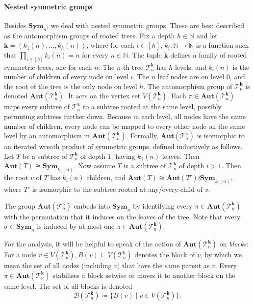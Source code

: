 \documentclass[11pt]{article}
\newcommand{\Aut}{\mathbf{Aut}}
\newcommand{\Sym}{\mathbf{Sym}}
\newcommand{\bbN}{\mathbb{N}}
\newcommand{\Bb}{{\mathcal B}}
\newcommand{\Tt}{{\mathcal T}}
\theoremstyle{definition}
\theoremstyle{plain}
\theoremstyle{remark}
\theoremstyle{remark}
\begin{document}
\paragraph*{Nested symmetric groups}
Besides $\Sym_n$, we deal with nested symmetric groups. These are best described as the automorphism groups of rooted trees. 
Fix a depth $h \in \bbN$ and let $\boldsymbol{k} = (k_1(n), \dots, k_h(n))$, where for each $i \in [h]$, $k_i \colon \bbN \to \bbN$ is a function such that $\prod_{i \in [h]} k_i(n) = n$ for every $n \in \bbN$. The tuple $\boldsymbol{k}$ defines a family of rooted symmetric trees, one for each $n$: The $n$-th tree $\Tt_n^{\boldsymbol{k}}$ has $h$ levels, and $k_i(n)$ is the number of children of every node on level $i$. 
The $n$ leaf nodes are on level $0$, and the root of the tree is the only node on level $h$. The automorphism group of $\Tt_n^{\boldsymbol{k}}$ is denoted $\Aut(\Tt_n^{\boldsymbol{k}})$. It acts on the vertex set $V(\Tt_n^{\boldsymbol{k}})$. Each $\pi \in \Aut(\Tt_n^{\boldsymbol{k}})$ maps every subtree of $\Tt_n^{\boldsymbol{k}}$ to a subtree rooted at the same level, possibly permuting subtrees further down. Because in each level, all nodes have the same number of children, every node can be mapped to every other node on the same level by an automorphism in $\Aut(\Tt_n^{\boldsymbol{k}})$.
Formally, $\Aut(\Tt_n^{\boldsymbol{k}})$ is isomorphic to an iterated wreath product of symmetric groups, defined inductively as follows.
Let $T$ be a subtree of $\Tt_n^{\boldsymbol{k}}$ of depth $1$, having $k_1(n)$ leaves. Then $\Aut(T) \cong \Sym_{k_1(n)}$. Now assume $T$ is a subtree of $\Tt_n^{\boldsymbol{k}}$ of depth $i > 1$. Then the root $v$ of $T$ has $k_i(n)$ children, and $\Aut(T) \cong \Aut(T') \wr \Sym_{k_i(n)}$, where $T'$ is isomorphic to the subtree rooted at any/every child of $v$. 


The group $\Aut(\Tt_n^{\boldsymbol{k}})$ embeds into $\Sym_n$ by identifying every $\pi \in \Aut(\Tt_n^{\boldsymbol{k}})$ with the permutation that it induces on the leaves of the tree. Note that every $\sigma \in \Sym_n$ is induced by at most one $\pi \in \Aut(\Tt_n^{\boldsymbol{k}})$. 

For the analysis, it will be helpful to speak of the action of $\Aut(\Tt_n^{\boldsymbol{k}})$ on \emph{blocks}: For a node $v \in V(\Tt_n^{\boldsymbol{k}}), B(v) \subseteq V(\Tt_n^{\boldsymbol{k}})$ denotes the block of $v$, by which we mean the set of all nodes (including $v$) that have the same parent as $v$. Every $\pi \in \Aut(\Tt_n^{\boldsymbol{k}})$ stabilises a block setwise or moves it to another block on the same level. The set of all blocks is denoted
\[
\Bb(\Tt_n^{\boldsymbol{k}}) \coloneqq \{ B(v) \mid v \in V(\Tt_n^{\boldsymbol{k}})  \}.
\]
\end{document}
